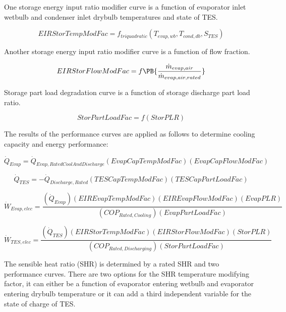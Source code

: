 One storage energy input ratio modifier curve is a function of evaporator inlet wetbulb and condenser inlet drybulb temperatures and state of TES.

\begin{equation}
EIRStorTempModFac = {f_{triquadratic}}\left( {{T_{evap,wb}},{T_{cond,db}},{S_{TES}}} \right)
\end{equation}

Another storage energy input ratio modifier curve is a function of flow fraction.

\begin{equation}
  EIRStorFlowModFac = f\PB{\frac{\dot{m}_{evap,air}}{\dot{m}_{evap,air,rated}}}
\end{equation}

Storage part load degradation curve is a function of storage discharge part load ratio.

\begin{equation}
StorPartLoadFac = f\left( {StorPLR} \right)
\end{equation}

The results of the performance curves are applied as follows to determine cooling capacity and energy performance:

\begin{equation}
{\dot Q_{Evap}} = {\dot Q_{Evap,RatedCoolAndDischarge}}\left( {EvapCapTempModFac} \right)\left( {EvapCapFlowModFac} \right)
\end{equation}

\begin{equation}
{\dot Q_{TES}} =  - {\dot Q_{Discharge,Rated}}\left( {TESCapTempModFac} \right)\left( {TESCapPartLoadFac} \right)
\end{equation}

\begin{equation}
{\dot W_{Evap,elec}} = \frac{{\left( {{{\dot Q}_{Evap}}} \right)\left( {EIREvapTempModFac} \right)\left( {EIREvapFlowModFac} \right)\left( {EvapPLR} \right)}}{{\left( {CO{P_{Rated,Cooling}}} \right)\left( {EvapPartLoadFac} \right)}}
\end{equation}

\begin{equation}
{\dot W_{TES,elec}} = \frac{{\left( {{{\dot Q}_{TES}}} \right)\left( {EIRStorTempModFac} \right)\left( {EIRStorFlowModFac} \right)\left( {StorPLR} \right)}}{{\left( {CO{P_{Rated,Discharging}}} \right)\left( {StorPartLoadFac} \right)}}
\end{equation}

The sensible heat ratio (SHR) is determined by a rated SHR and two performance curves. There are two options for the SHR temperature modifying factor, it can either be a function of evaporator entering wetbulb and evaporator entering drybulb temperature or it can add a third independent variable for the state of charge of TES.

